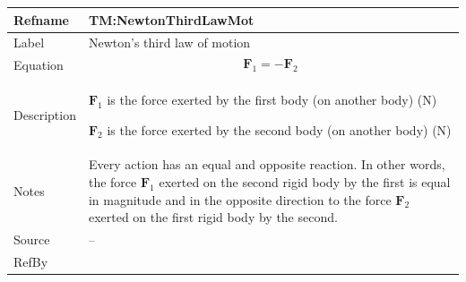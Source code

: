 \documentclass[12pt]{article}
\begin{document}
\medskip
\noindent
\begin{minipage}{\textwidth}
\begin{tabular}{>{\raggedright}p{}>{\raggedright\arraybackslash}p{}}
\toprule \textbf{Refname} & \textbf{TM:NewtonThirdLawMot}
\label{TM:NewtonThirdLawMot}
\\ \midrule
Label & Newton's third law of motion
        
\\ \midrule
Equation & \begin{displaymath}
           {\symbf{F}_{1}}=-{\symbf{F}_{2}}
           \end{displaymath}
\\ \midrule
Description & \begin{symbDescription}
              \item{${\symbf{F}_{1}}$ is the force exerted by the first body (on another body) (${\text{N}}$)}
              \item{${\symbf{F}_{2}}$ is the force exerted by the second body (on another body) (${\text{N}}$)}
              \end{symbDescription}
\\ \midrule
Notes & Every action has an equal and opposite reaction. In other words, the force ${\symbf{F}_{1}}$ exerted on the second rigid body by the first is equal in magnitude and in the opposite direction to the force ${\symbf{F}_{2}}$ exerted on the first rigid body by the second.
        
\\ \midrule
Source & --
         
\\ \midrule
RefBy & 
\\ \bottomrule
\end{tabular}
\end{minipage}
\end{document}

